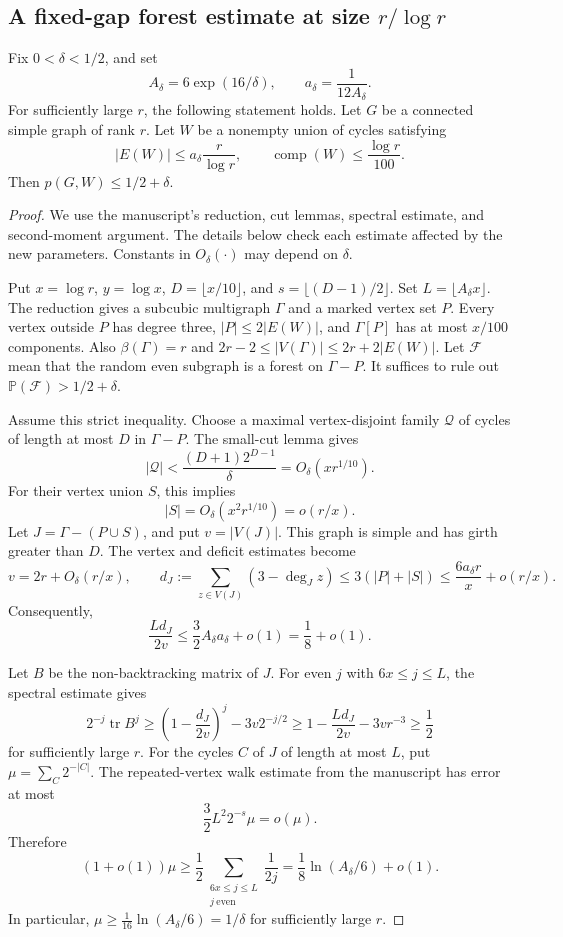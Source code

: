 \subsection{A fixed-gap forest estimate at size \texorpdfstring{$r/\log r$}{r/log r}}

\begin{theorem}\label{thm:research-marked-size}
Fix $0<\delta<1/2$, and set
\[
 A_\delta=6\exp(16/\delta),\qquad
 a_\delta=\frac{1}{12A_\delta}.
\]
For sufficiently large $r$, the following statement holds.
Let $G$ be a connected simple graph of rank $r$.
Let $W$ be a nonempty union of cycles satisfying
\[
 |E(W)|\le a_\delta\frac{r}{\log r},\qquad
 \operatorname{comp}(W)\le\frac{\log r}{100}.
\]
Then $p(G,W)\le1/2+\delta$.
\end{theorem}

\begin{proof}
We use the manuscript's reduction, cut lemmas, spectral estimate, and second-moment argument.
The details below check each estimate affected by the new parameters.
Constants in $O_\delta(\cdot)$ may depend on $\delta$.

Put $x=\log r$, $y=\log x$, $D=\lfloor x/10\rfloor$, and $s=\lfloor(D-1)/2\rfloor$.
Set $L=\lfloor A_\delta x\rfloor$.
The reduction gives a subcubic multigraph $\Gamma$ and a marked vertex set $P$.
Every vertex outside $P$ has degree three, $|P|\le2|E(W)|$, and $\Gamma[P]$ has at most $x/100$ components.
Also $\beta(\Gamma)=r$ and $2r-2\le |V(\Gamma)|\le2r+2|E(W)|$.
Let $\mathcal F$ mean that the random even subgraph is a forest on $\Gamma-P$.
It suffices to rule out $\mathbb P(\mathcal F)>1/2+\delta$.

Assume this strict inequality.
Choose a maximal vertex-disjoint family $\mathcal Q$ of cycles of length at most $D$ in $\Gamma-P$.
The small-cut lemma gives
\[
 |\mathcal Q|<\frac{(D+1)2^{D-1}}{\delta}
       =O_\delta(xr^{1/10}).
\]
For their vertex union $S$, this implies
\[
 |S|=O_\delta(x^2r^{1/10})=o(r/x).
\]
Let $J=\Gamma-(P\cup S)$, and put $v=|V(J)|$.
This graph is simple and has girth greater than $D$.
The vertex and deficit estimates become
\[
 v=2r+O_\delta(r/x),\qquad
 d_J:=\sum_{z\in V(J)}(3-\deg_Jz)
 \le 3(|P|+|S|)
 \le\frac{6a_\delta r}{x}+o(r/x).
\]
Consequently,
\[
 \frac{Ld_J}{2v}\le\frac32 A_\delta a_\delta+o(1)
                 =\frac18+o(1).
\]

Let $B$ be the non-backtracking matrix of $J$.
For even $j$ with $6x\le j\le L$, the spectral estimate gives
\[
 2^{-j}\operatorname{tr}B^j
 \ge\left(1-\frac{d_J}{2v}\right)^j-3v2^{-j/2}
 \ge1-\frac{Ld_J}{2v}-3vr^{-3}\ge\frac12
\]
for sufficiently large $r$.
For the cycles $C$ of $J$ of length at most $L$, put
$\mu=\sum_C2^{-|C|}$.
The repeated-vertex walk estimate from the manuscript has error at most
\[
 \frac32 L^2 2^{-s}\mu=o(\mu).
\]
Therefore
\[
 (1+o(1))\mu
 \ge\frac12\sum_{\substack{6x\le j\le L\\j\ \mathrm{even}}}\frac1{2j}
 =\frac18\ln(A_\delta/6)+o(1).
\]
In particular, $\mu\ge\frac1{16}\ln(A_\delta/6)=1/\delta$ for sufficiently large $r$.


\end{proof}
